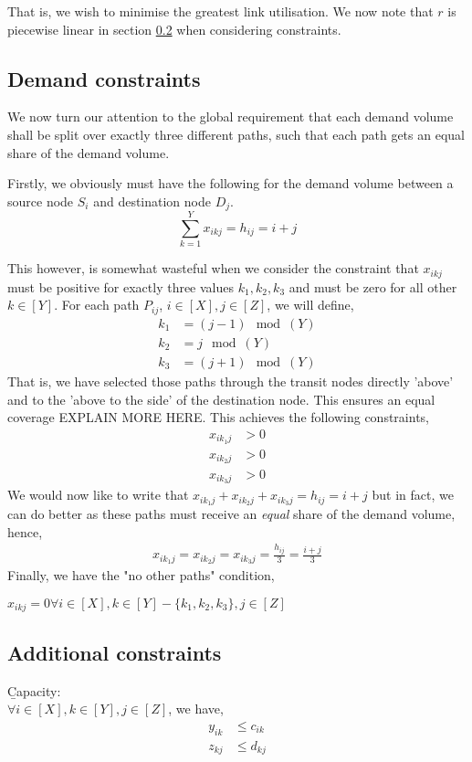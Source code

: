 \documentclass[12pt,twoside]{article}
\begin{document}
That is, we wish to minimise the greatest link utilisation. We now note that $r$ is piecewise linear in section \ref{Sec: Const} when considering constraints.

\subsection{Demand constraints}
We now turn our attention to the global requirement that each demand volume shall be split over exactly three different paths, such that each path gets an equal
share of the demand volume.

Firstly, we obviously must have the following for the demand volume between a source node $S_i$ and destination node $D_j$.
\begin{equation}\label{3}
	\sum_{k=1}^{Y}x_{ikj} = h_{ij} = i + j
\end{equation}

This however, is somewhat wasteful when we consider the constraint that $x_{ikj}$ must be positive for exactly three values
$k_1, k_2, k_3$  and must be zero for all other $k \in [Y]$.
For each path $P_{ij}$, $i \in [X], j \in [Z]$, we will define,
\begin{align*}
	k_1 &= (j-1) \mod(Y)\\
	k_2 &= j \mod(Y)\\
	k_3 &= (j+1) \mod(Y)
\end{align*}
That is, we have selected those paths through the transit nodes directly 'above' and to the 'above to the side' of the destination node. This ensures an equal coverage EXPLAIN MORE HERE. This achieves the following constraints,
\begin{align*}
	x_{ik_1j} &> 0\\
	x_{ik_2j} &> 0\\
	x_{ik_3j} &> 0
\end{align*}
We would now like to write that $x_{ik_1j} + x_{ik_2j}  + x_{ik_3j} = h_{ij} = i + j$ but in fact, we can do better as these paths must receive an \emph{equal} share of the demand volume, hence,
\begin{align*}
	x_{ik_1j} = x_{ik_2j} = x_{ik_3j}= \frac{h_{ij}}{3} =\frac{i+j}{3} 
\end{align*}
Finally, we have the "no other paths" condition, 
\begin{center}
	$x_{ikj} = 0
	\forall i \in [X], k \in [Y] -\{k_1,k_2,k_3\}, j \in [Z]$
\end{center}


\subsection{Additional constraints}\label{Sec: Const} 
\b{Capacity}:\\
$\forall i \in [X], k \in [Y], j \in [Z]$, we have,
\begin{align*}
	y_{ik} &\leq c_{ik} \\
	z_{kj} &\leq d_{kj}  
\end{align*}
\end{document}

